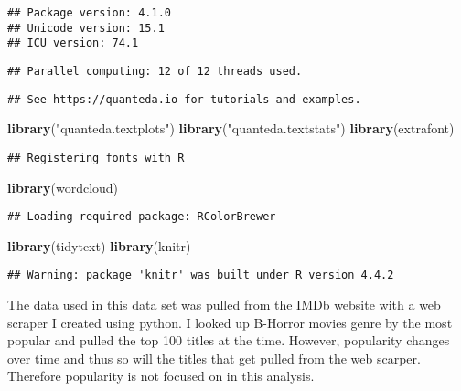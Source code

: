 \documentclass[
]{article}
\newenvironment{Shaded}{\begin{snugshade}}{\end{snugshade}}
\newcommand{\FunctionTok}[1]{\textcolor[rgb]{0.13,0.29,0.53}{\textbf{#1}}}
\newcommand{\NormalTok}[1]{#1}
\newcommand{\StringTok}[1]{\textcolor[rgb]{0.31,0.60,0.02}{#1}}
\begin{document}
\begin{verbatim}
## Package version: 4.1.0
## Unicode version: 15.1
## ICU version: 74.1
\end{verbatim}

\begin{verbatim}
## Parallel computing: 12 of 12 threads used.
\end{verbatim}

\begin{verbatim}
## See https://quanteda.io for tutorials and examples.
\end{verbatim}

\begin{Shaded}
\begin{Highlighting}[]
\FunctionTok{library}\NormalTok{(}\StringTok{"quanteda.textplots"}\NormalTok{)}
\FunctionTok{library}\NormalTok{(}\StringTok{"quanteda.textstats"}\NormalTok{)}
\FunctionTok{library}\NormalTok{(extrafont)}
\end{Highlighting}
\end{Shaded}

\begin{verbatim}
## Registering fonts with R
\end{verbatim}

\begin{Shaded}
\begin{Highlighting}[]
\FunctionTok{library}\NormalTok{(wordcloud)}
\end{Highlighting}
\end{Shaded}

\begin{verbatim}
## Loading required package: RColorBrewer
\end{verbatim}

\begin{Shaded}
\begin{Highlighting}[]
\FunctionTok{library}\NormalTok{(tidytext)}
\FunctionTok{library}\NormalTok{(knitr)}
\end{Highlighting}
\end{Shaded}

\begin{verbatim}
## Warning: package 'knitr' was built under R version 4.4.2
\end{verbatim}

The data used in this data set was pulled from the IMDb website with a
web scraper I created using python. I looked up B-Horror movies genre by
the most popular and pulled the top 100 titles at the time. However,
popularity changes over time and thus so will the titles that get pulled
from the web scarper. Therefore popularity is not focused on in this
analysis.
\end{document}
